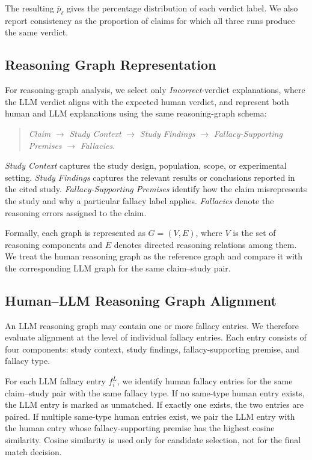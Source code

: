 \documentclass[11pt]{article}
\begin{document}
\noindent
The resulting $\bar{p}_{\ell}$ gives the percentage distribution of each verdict label. 
We also report consistency as the proportion of claims for which all three runs produce the same verdict.

\subsection{Reasoning Graph Representation}
\label{subsec:reasoning-graph}

For reasoning-graph analysis, we select only \textit{Incorrect}-verdict explanations, where the LLM verdict aligns with the expected human verdict, and represent both human and LLM explanations using the same reasoning-graph schema:

\begin{quote}
\small
\textit{Claim} $\rightarrow$ \textit{Study Context} $\rightarrow$ \textit{Study Findings} $\rightarrow$ \textit{Fallacy-Supporting Premises} $\rightarrow$ \textit{Fallacies}.
\end{quote}

\noindent
\textit{Study Context} captures the study design, population, scope, or experimental setting. 
\textit{Study Findings} captures the relevant results or conclusions reported in the cited study. 
\textit{Fallacy-Supporting Premises} identify how the claim misrepresents the study and why a particular fallacy label applies. 
\textit{Fallacies} denote the reasoning errors assigned to the claim.

Formally, each graph is represented as $G=(V,E)$, where $V$ is the set of reasoning components and $E$ denotes directed reasoning relations among them. 
We treat the human reasoning graph as the reference graph and compare it with the corresponding LLM graph for the same claim--study pair.

\subsection{Human--LLM Reasoning Graph Alignment}
\label{subsec:graph-alignment}

An LLM reasoning graph may contain one or more fallacy entries. 
We therefore evaluate alignment at the level of individual fallacy entries. 
Each entry consists of four components: study context, study findings, fallacy-supporting premise, and fallacy type.

For each LLM fallacy entry $f_i^{L}$, we identify human fallacy entries for the same claim--study pair with the same fallacy type. 
If no same-type human entry exists, the LLM entry is marked as unmatched. 
If exactly one exists, the two entries are paired. 
If multiple same-type human entries exist, we pair the LLM entry with the human entry whose fallacy-supporting premise has the highest cosine similarity. 
Cosine similarity is used only for candidate selection, not for the final match decision.
\end{document}
